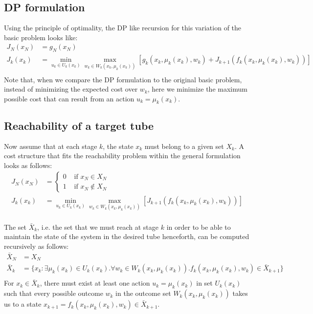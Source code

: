 \documentclass[11pt, oneside]{article}   	%
\begin{document}
\subsection{DP formulation}
Using the principle of optimality, the DP like recursion for this variation of the basic problem looks like:
\begin{align*}
J_{N}(x_{N}) &= g_N(x_N)\\
J_{k}(x_{k}) &= \min_{u_k \in U_k(x_k)} \max_{w_k \in W_k(x_k,\mu_k(x_k))} \left[ g_k(x_k,\mu_k(x_k),w_k) + J_{k+1}(f_k(x_k,\mu_k(x_k),w_k))\right]\\
\end{align*}
Note that, when we compare the DP formulation to the original basic problem, instead of minimizing the expected cost over $w_k$, here we minimize the maximum possible cost that can result from an action $u_k=\mu_k(x_k)$.

\subsection{Reachability of a target tube}
Now assume that at each stage $k$, the state $x_k$ must belong to a given set $X_k$. A cost structure that fits the reachability problem within the general formulation looks as follows:
\begin{align*}
J_{N}(x_{N}) &= 
\begin{cases}
0 & \text{ if } x_N \in X_N\\
1 & \text{ if } x_N \not\in X_N
\end{cases}\\
J_{k}(x_{k}) &= \min_{u_k \in U_k(x_k)} \max_{w_k \in W_k(x_k,\mu_k(x_k))} \left[ J_{k+1}(f_k(x_k,\mu_k(x_k),w_k))\right]\\
\end{align*}

The set $\bar{X}_k$, i.e. the set that we must reach at stage $k$ in order to be able to maintain the state of the system in the desired tube henceforth, can be computed recursively as follows:
\begin{align*}
\bar{X}_N &= X_N\\
\bar{X}_k &= \{x_k: \exists \mu_k(x_k) \in U_k(x_k).\forall w_k\in W_k(x_k,\mu_k(x_k)).f_k(x_k,\mu_k(x_k),w_k) \in \bar{X}_{k+1}\}\\
\end{align*}
For $x_k \in \bar{X}_k$, there must exist at least one action $u_k=\mu_k(x_k)$ in set $U_k(x_k)$ such that every possible outcome $w_k$ in the outcome set $W_k(x_k,\mu_k(x_k))$ takes us to a state $x_{k+1} = f_k(x_k,\mu_k(x_k),w_k) \in \bar{X}_{k+1}$.
\end{document}
